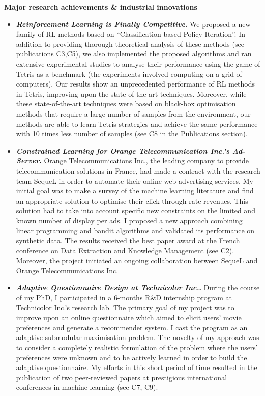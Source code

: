 \noindent 
\textbf{Major research achievements \& industrial innovations}
\\[-.4cm]\noindent\makebox[\linewidth]{\rule{\columnwidth}{0.4pt}}
\begin{itemize}
\item \textit{\textbf{Reinforcement Learning is Finally Competitive}}\textit{}\textbf{.} We proposed a new family of RL methods based on ``Classification-based Policy Iteration''. In addition to providing thorough theoretical analysis of these methods (see publications C3,C5), we also implemented the proposed algorithms and ran extensive experimental studies to analyse their performance using the game of Tetris as a benchmark (the experiments involved computing on a grid of computers). Our results show an unprecedented performance of RL methods in Tetris, improving upon the state-of-the-art techniques. Moreover, while these state-of-the-art techniques were based on black-box optimisation methods that require a large number of samples from the environment, our methods are able to learn Tetris strategies and achieve the same performance with 10 times less number of samples (see C8 in the Publications section).
\item \textit{\textbf{Constrained Learning for Orange Telecommunication Inc.'s Ad-Server}}\textit{}\textbf{.}
Orange Telecommunications Inc., the leading company to provide telecommunication solutions in France, had made a contract with the research team SequeL in order to automate their online web-advertising services. My initial goal was to make a survey of the machine learning literature and find an appropriate solution to optimise their click-through rate revenues. This solution had to take into account specific new constraints on the limited and known number of display per ads. I proposed a new approach combining linear programming and bandit algorithms and validated its performance on synthetic data. The results received the best paper award at the French conference on Data Extraction and Knowledge Management (see C2). Moreover, the project initiated an ongoing collaboration between SequeL and Orange Telecommunications Inc.
\item \textit{\textbf{Adaptive Questionnaire Design at Technicolor Inc.}}\textit{}\textbf{.}
During the course of my PhD, I participated in a 6-months R\&D internship program at Technicolor Inc.'s research lab. The primary goal of my project was to improve upon an online questionnaire which aimed to elicit users' movie preferences and generate a recommender system. I cast the program as an adaptive submodular maximisation problem. 
The novelty of my approach was to consider a completely realistic formulation of the problem where the users' preferences were unknown and to be actively learned in order to build the adaptive questionnaire.  
My efforts in this short period of time resulted in the publication of two peer-reviewed papers at prestigious international conferences in machine learning (see C7, C9). 
\end{itemize}

